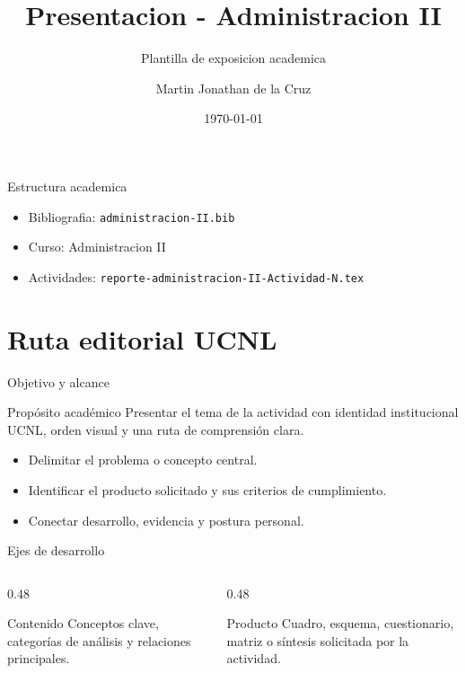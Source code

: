 ﻿\documentclass[spanish,aspectratio=169]{beamer}
\title{Presentacion - Administracion II}
\subtitle{Plantilla de exposicion academica}
\author{Martin Jonathan de la Cruz}
\institute{Universidad Ciudadana de Nuevo Leon}
\date{\today}
\begin{document}
\begin{frame}
  \titlepage
\end{frame}

\begin{frame}{Estructura academica}
  \begin{itemize}
    \item Bibliografia: \texttt{administracion-II.bib}
    \item Curso: Administracion II
    \item Actividades: \texttt{reporte-administracion-II-Actividad-N.tex}
  \end{itemize}
\end{frame}


\section{Ruta editorial UCNL}

\begin{frame}{Objetivo y alcance}
  \begin{block}{Propósito académico}
    Presentar el tema de la actividad con identidad institucional UCNL, orden visual y una ruta de comprensión clara.
  \end{block}
  \begin{itemize}
    \item Delimitar el problema o concepto central.
    \item Identificar el producto solicitado y sus criterios de cumplimiento.
    \item Conectar desarrollo, evidencia y postura personal.
  \end{itemize}
\end{frame}

\begin{frame}{Ejes de desarrollo}
  \begin{columns}[T,totalwidth=\textwidth]
    \begin{column}{0.48\textwidth}
      \begin{block}{Contenido}
        Conceptos clave, categorías de análisis y relaciones principales.
      \end{block}
    \end{column}
    \begin{column}{0.48\textwidth}
      \begin{block}{Producto}
        Cuadro, esquema, cuestionario, matriz o síntesis solicitada por la actividad.
      \end{block}
    \end{column}
  \end{columns}
\end{frame}
\end{document}
